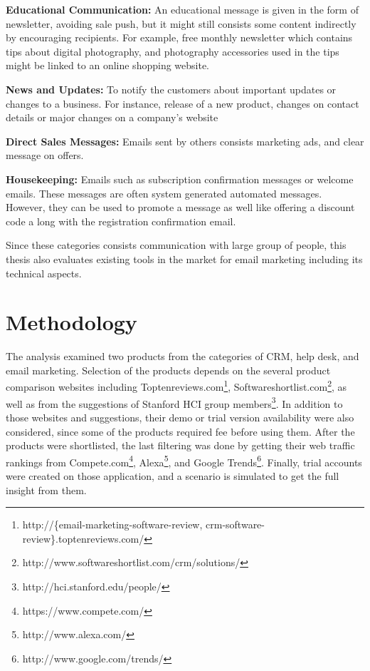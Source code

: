 \begin{compactitem}
	\item \textbf{Educational Communication:} An educational message is given in the form of newsletter, avoiding sale push, but it might still consists some content indirectly by encouraging recipients. For example, free monthly newsletter which contains tips about digital photography, and photography accessories used in the tips might be linked to an online shopping website. 
	\item \textbf{News and Updates:} To notify the customers about important updates or changes to a business. For instance, release of a new product, changes on contact details or major changes on a company's website
	\item \textbf{Direct Sales Messages:} Emails sent by others consists marketing ads, and clear message on offers.
	\item \textbf{Housekeeping:} Emails such as subscription confirmation messages or welcome emails. These messages are often system generated automated messages. However, they can be used to promote a message as well like offering a discount code a long with the registration confirmation email.
\end{compactitem}

Since these categories consists communication with large group of people, this thesis also evaluates existing tools in the market for email marketing including its technical aspects.

\section{Methodology}
\label{sec:3.2:Meth}

The analysis examined two products from the categories of \ac{CRM}, help desk, and email marketing. Selection of the products depends on the several product comparison websites including Toptenreviews.com\footnote{http://\{email-marketing-software-review, crm-software-review\}.toptenreviews.com/ }, Softwareshortlist.com\footnote{http://www.softwareshortlist.com/crm/solutions/}, as well as from the suggestions of Stanford HCI group members\footnote{http://hci.stanford.edu/people/}. In addition to those websites and suggestions, their demo or trial version availability were also considered, since some of the products required fee before using them. After the products were shortlisted, the last filtering was done by getting their web traffic rankings from Compete.com\footnote{https://www.compete.com/}, Alexa\footnote{http://www.alexa.com/}, and Google Trends\footnote{http://www.google.com/trends/}. Finally, trial accounts were created on those application, and a scenario is simulated to get the full insight from them. 

